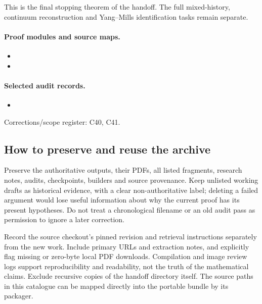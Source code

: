 \documentclass[11pt]{article}
\theoremstyle{remark}
\begin{document}
This is the final stopping theorem of the handoff. The full mixed-history, continuum reconstruction and Yang--Mills identification tasks remain separate.

\paragraph{Proof modules and source maps.}
\begingroup\small
\begin{itemize}
\item {}
\item {}
\end{itemize}
\endgroup

\paragraph{Selected audit records.}
\begingroup\small
\begin{itemize}
\item {}
\end{itemize}
\endgroup
Corrections/scope register: C40, C41.\par

\subsection{How to preserve and reuse the archive}
\label{hnc-archive-policy}
Preserve the authoritative outputs, their PDFs, all listed fragments,
research notes, audits, checkpoints, builders and source provenance.
Keep unlisted working drafts as historical evidence, with a clear
non-authoritative label; deleting a failed argument would lose useful
information about why the current proof has its present hypotheses.
Do not treat a chronological filename or an old audit pass as permission
to ignore a later correction.

Record the source checkout's pinned revision and retrieval instructions
separately from the new work. Include primary URLs and extraction notes, and explicitly
flag missing or zero-byte local PDF downloads. Compilation and image
review logs support reproducibility and readability, not the truth of
the mathematical claims. Exclude recursive copies of the handoff
directory itself. The source paths in this catalogue can be mapped
directly into the portable bundle by its packager.
\end{document}
